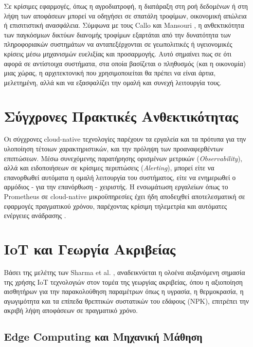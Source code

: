 Σε κρίσιμες εφαρμογές, όπως η αγροδιατροφή, η διατάραξη στη ροή δεδομένων ή στη λήψη των αποφάσεων μπορεί να οδηγήσει σε σπατάλη τροφίμων, οικονομική απώλεια ή επισιτιστική ανασφάλεια. Σύμφωνα με τους Callo και Mansouri \cite{foodsec}, η ανθεκτικότητα των παγκόσμιων δικτύων διανομής τροφίμων εξαρτάται από την δυνατότητα των πληροφοριακών συστημάτων να ανταπεξέρχονται σε γεωπολιτικές ή υγειονομικές κρίσεις μέσω μηχανισμών ευελιξίας και προσαρμογής. Αυτό σημαίνει πως σε ότι αφορά σε αντίστοιχα συστήματα, στα οποία βασίζεται ο πληθυσμός (και η οικονομία) μιας χώρας, η αρχιτεκτονική που χρησιμοποιείται θα πρέπει να είναι άρτια, μελετημένη, αλλά και να εξασφαλίζει την ομαλή και συνεχή λειτουργία τους.

\section{Σύγχρονες Πρακτικές Ανθεκτικότητας}

Οι σύγχρονες cloud-native τεχνολογίες παρέχουν τα εργαλεία και τα πρότυπα για την υλοποίηση τέτοιων χαρακτηριστικών, και την πρόληψη των προαναφερθέντων επιπτώσεων. Μέσω συνεχόμενης παρατήρησης ορισμένων μετρικών (\textit{Observability}), αλλά και ειδοποιήσεων σε κρίσιμες περιπτώσεις (\textit{Alerting}), μπορεί είτε να επανορθωθεί αυτόματα η ομαλή λειτουργία του συστήματος, είτε να ενημερωθεί ο αρμόδιος - για την επανόρθωση - χειριστής. Η ενσωμάτωση εργαλείων όπως το Prometheus σε cloud-native μικροϋπηρεσίες έχει ήδη αποδειχθεί αποτελεσματική σε εφαρμογές πραγματικού χρόνου, παρέχοντας κρίσιμη τηλεμετρία και αυτόματες ενέργειες ανάδρασης \cite{iotmonitoring}.

\section{IoT και Γεωργία Ακριβείας}

Βάσει της μελέτης των Sharma et al. \cite{iotagriculture}, αναδεικνύεται η ολοένα αυξανόμενη σημασία της χρήσης IoT τεχνολογιών στον τομέα της γεωργίας ακριβείας, όπου η αξιοποίηση αισθητήρων για την παρακολούθηση παραμέτρων όπως η υγρασία, η θερμοκρασία, η αγωγιμότητα και τα επίπεδα θρεπτικών συστατικών του εδάφους (NPK), επιτρέπει την ακριβή λήψη αποφάσεων σε πραγματικό χρόνο.

\subsection{Edge Computing και Μηχανική Μάθηση}

